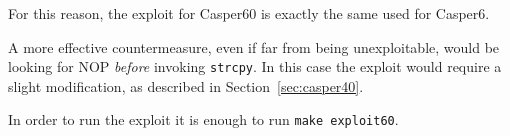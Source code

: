 For this reason, the exploit for Casper60 is exactly the same used for Casper6. 

A more effective countermeasure, even if far from being unexploitable, would be looking for NOP \textit{before} invoking \texttt{strcpy}. In this case the exploit would require a slight modification, as described in Section~\ref{sec:casper40}.

In order to run the exploit it is enough to run \texttt{make exploit60}.
